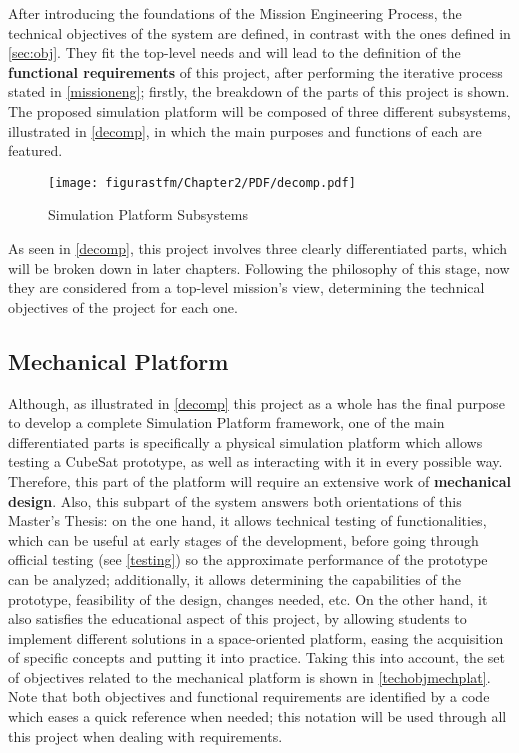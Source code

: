 After introducing the foundations of the Mission Engineering Process, the technical objectives of the system are defined, in contrast with the ones defined in \autoref{sec:obj}. They fit the top-level needs and will lead to the definition of the \textbf{functional requirements} of this project, after performing the iterative process stated in \autoref{missioneng}; firstly, the breakdown of the parts of this project is shown. The proposed simulation platform will be composed of three different subsystems, illustrated in \autoref{decomp}, in which the main purposes and functions of each are featured.

\begin{figure}
				\centering
				\texttt{[image: figurastfm/Chapter2/PDF/decomp.pdf]}
				\caption{Simulation Platform Subsystems}      		
				\label{decomp}
\end{figure}


As seen in \autoref{decomp}, this project involves three clearly differentiated parts, which will be broken down in later chapters. Following the philosophy of this stage, now they are considered from a top-level mission's view, determining the technical objectives of the project for each one.


\subsection{Mechanical Platform}

Although, as illustrated in \autoref{decomp} this project as a whole has the final purpose to develop a complete Simulation Platform framework, one of the main differentiated parts is specifically a physical simulation platform which allows testing a CubeSat prototype, as well as interacting with it in every possible way. Therefore, this  part of the platform will require an extensive work of \textbf{mechanical design}. Also, this subpart of the system answers both orientations of this Master's Thesis: on the one hand, it allows technical testing of functionalities, which can be useful at early stages of the development, before going through official testing (see \autoref{testing}) so the approximate performance of the prototype can be analyzed; additionally, it allows determining the capabilities of the prototype, feasibility of the design, changes needed, etc. On the other hand, it also satisfies the educational aspect of this project, by allowing students to implement different solutions in a space-oriented platform, easing the acquisition of specific concepts and putting it into practice. Taking this into account, the set of objectives related to the mechanical platform is shown in  \autoref{techobjmechplat}. Note that both objectives and functional requirements are identified by a code which eases a quick reference when needed; this notation will be used through all this project when dealing with requirements.

